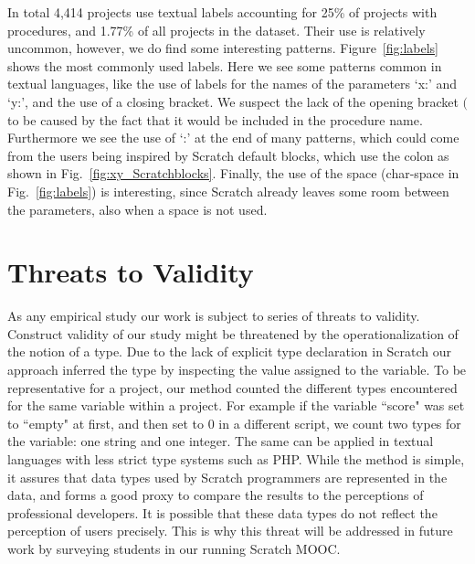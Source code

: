 \documentclass[conference]{IEEEtran}
\begin{document}
In total 4,414 projects use textual labels accounting for 25\% of projects with procedures, and 1.77\% of all projects in the dataset. Their use is relatively uncommon, however, we do find some interesting patterns. 
Figure~\ref{fig:labels} shows the most commonly used labels. Here we see some patterns common in textual languages, like the use of labels for the names of the parameters `x:' and `y:', and the use of a closing bracket. We suspect the lack of the opening bracket $($ to be caused by the fact that it would be included in the procedure name.
Furthermore we see the use of `:' at the end of many patterns, which could come from the users being inspired by Scratch default blocks, which use the colon as shown in Fig.~\ref{fig:xy_Scratchblocks}. 
Finally, the use of the space (char-space in Fig.~\ref{fig:labels}) is interesting, since Scratch already leaves some room between the parameters, also when a space is not used. 

\section{Threats to Validity}
As any empirical study our work is subject to series of threats to validity.
Construct validity of our study might be threatened by the operationalization of the notion of a type. 
Due to the lack of explicit type declaration in Scratch our approach inferred the type by inspecting the value assigned to the variable. To be representative for a project, our method counted the different types encountered for the same variable within a project. For example if the variable ``score" was set to ``empty" at first, and then set to 0 in a different script, we count two types for the variable: one string and one integer. The same can be applied in textual languages with less strict type systems such as PHP. While the method is simple, it assures that data types used by Scratch programmers are represented in the data, and forms a good proxy to compare the results to the perceptions of professional developers. It is possible that these data types do not reflect the perception of users precisely. This is why this threat will be addressed in future work by surveying students in our running Scratch MOOC.
\end{document}
